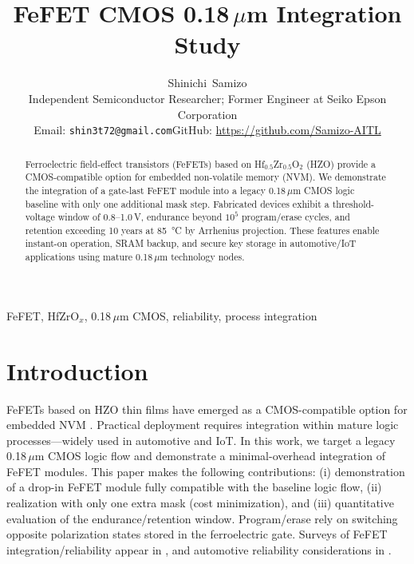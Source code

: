 \documentclass[journal]{IEEEtran}
\begin{document}
\title{FeFET CMOS 0.18\,$\mu$m Integration Study}

\author{Shinichi~Samizo\\
\small Independent Semiconductor Researcher; Former Engineer at Seiko Epson Corporation\\
\small Email: \texttt{shin3t72@gmail.com}\quad GitHub: \url{https://github.com/Samizo-AITL}}
\maketitle

\begin{abstract}
Ferroelectric field-effect transistors (FeFETs) based on Hf$_{0.5}$Zr$_{0.5}$O$_2$ (HZO) provide a CMOS-compatible option for embedded non-volatile memory (NVM). We demonstrate the integration of a gate-last FeFET module into a legacy 0.18\,$\mu$m CMOS logic baseline with only one additional mask step. Fabricated devices exhibit a threshold-voltage window of 0.8--1.0\,V, endurance beyond $10^5$ program/erase cycles, and retention exceeding 10 years at \SI{85}{\celsius} by Arrhenius projection. These features enable instant-on operation, SRAM backup, and secure key storage in automotive/IoT applications using mature 0.18\,$\mu$m technology nodes.
\end{abstract}

\begin{IEEEkeywords}
FeFET, HfZrO$_x$, 0.18\,$\mu$m CMOS, reliability, process integration
\end{IEEEkeywords}

\section{Introduction}
FeFETs based on HZO thin films have emerged as a CMOS-compatible option for embedded NVM \cite{Boscke2011,Muller2012,Schenk2019}. Practical deployment requires integration within mature logic processes---widely used in automotive and IoT. In this work, we target a legacy 0.18\,$\mu$m CMOS logic flow and demonstrate a minimal-overhead integration of FeFET modules. This paper makes the following contributions: (i) demonstration of a drop-in FeFET module fully compatible with the baseline logic flow, (ii) realization with only one extra mask (cost minimization), and (iii) quantitative evaluation of the endurance/retention window. Program/erase rely on switching opposite polarization states stored in the ferroelectric gate. Surveys of FeFET integration/reliability appear in \cite{Muller2015,Park2020}, and automotive reliability considerations in \cite{Nakamura2003}.
\end{document}
